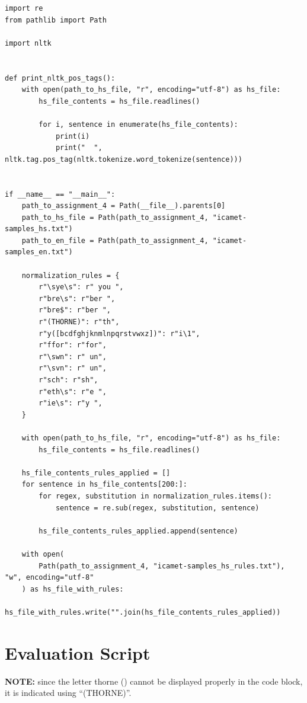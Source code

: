 \documentclass{article}
\begin{document}
\begin{lstlisting}
import re
from pathlib import Path

import nltk


def print_nltk_pos_tags():
    with open(path_to_hs_file, "r", encoding="utf-8") as hs_file:
        hs_file_contents = hs_file.readlines()

        for i, sentence in enumerate(hs_file_contents):
            print(i)
            print("  ", nltk.tag.pos_tag(nltk.tokenize.word_tokenize(sentence)))


if __name__ == "__main__":
    path_to_assignment_4 = Path(__file__).parents[0]
    path_to_hs_file = Path(path_to_assignment_4, "icamet-samples_hs.txt")
    path_to_en_file = Path(path_to_assignment_4, "icamet-samples_en.txt")

    normalization_rules = {
        r"\sye\s": r" you ",
        r"bre\s": r"ber ",
        r"bre$": r"ber ",
        r"(THORNE)": r"th",
        r"y([bcdfghjknmlnpqrstvwxz])": r"i\1",
        r"ffor": r"for",
        r"\swn": r" un",
        r"\svn": r" un",
        r"sch": r"sh",
        r"eth\s": r"e ",
        r"ie\s": r"y ",
    }

    with open(path_to_hs_file, "r", encoding="utf-8") as hs_file:
        hs_file_contents = hs_file.readlines()

    hs_file_contents_rules_applied = []
    for sentence in hs_file_contents[200:]:
        for regex, substitution in normalization_rules.items():
            sentence = re.sub(regex, substitution, sentence)

        hs_file_contents_rules_applied.append(sentence)

    with open(
        Path(path_to_assignment_4, "icamet-samples_hs_rules.txt"), "w", encoding="utf-8"
    ) as hs_file_with_rules:
        hs_file_with_rules.write("".join(hs_file_contents_rules_applied))
\end{lstlisting}

\newpage
\section{Evaluation Script}
\textbf{NOTE:} since the letter thorne (\TH) cannot be displayed properly in the code block, it is indicated using ``(THORNE)''.
\end{document}
